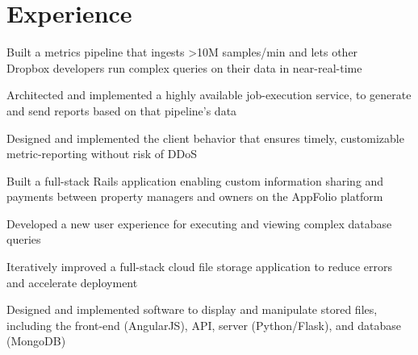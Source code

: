 \section{Experience}

\begin{tightemize}
\item Built a metrics pipeline that ingests >10M samples/min and lets other \\ Dropbox developers run complex queries on their data in near-real-time
\item Architected and implemented a highly available job-execution service, to generate and send reports based on that pipeline's data
\item Designed and implemented the client behavior that ensures timely, customizable metric-reporting without risk of DDoS
\end{tightemize}
\sectionsep

\begin{tightemize}
\item Built a full-stack Rails application enabling custom information sharing and payments between property managers and owners on the AppFolio platform
\item Developed a new user experience for executing and viewing complex database queries
\end{tightemize}
\sectionsep

\begin{tightemize}
\item Iteratively improved a full-stack cloud file storage application to reduce errors and accelerate deployment
\item Designed and implemented software to display and manipulate stored files, including the front-end (AngularJS), API, server (Python/Flask), and database (MongoDB)
\end{tightemize}
\sectionsep
